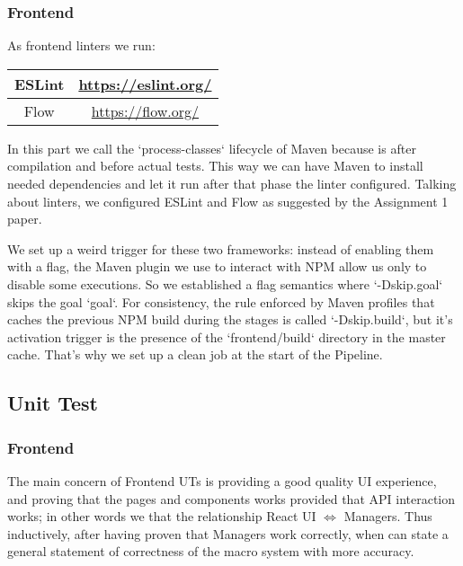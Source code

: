 \documentclass[a4paper,10pt]{scrartcl}
\begin{document}
\subsubsection{Frontend}

As frontend linters we run:
\begin{center}
    \begin{tabular}{|c|c|}
        \hline
        ESLint & \href{https://eslint.org/}{https://eslint.org/} \\
        \hline
        Flow & \href{https://flow.org/}{https://flow.org/} \\
        \hline
    \end{tabular}
\end{center}

In this part we call the `process-classes` lifecycle of Maven because is after compilation and before actual tests. This way we can have Maven to install needed dependencies and let it run after that phase the linter configured. Talking about linters, we configured ESLint and Flow as suggested by the Assignment 1 paper.

We set up a weird trigger for these two frameworks: instead of enabling them with a flag, the Maven plugin we use to interact with NPM allow us only to disable some executions. So we established a flag semantics where `-Dskip.{goal}` skips the goal `goal`. For consistency, the rule enforced by Maven profiles that caches the previous NPM build during the stages is called `-Dskip.build`, but it's activation trigger is the presence of the `frontend/build` directory in the master cache. That's why we set up a clean job at the start of the Pipeline.

\subsection{Unit Test}

\subsubsection{Frontend}

The main concern of Frontend UTs is providing a good quality UI experience, and proving that the pages and components works provided that API interaction works; in other words we that the relationship React UI $\Leftrightarrow$ Managers. Thus inductively, after having proven that Managers work correctly, when can state a general statement of correctness of the macro system with more accuracy.
\end{document}
